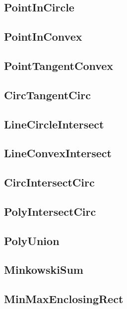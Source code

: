 \subsection{PointInCircle}

\subsection{PointInConvex}

\subsection{PointTangentConvex}

\subsection{CircTangentCirc}

\subsection{LineCircleIntersect}

\subsection{LineConvexIntersect}

\subsection{CircIntersectCirc}

\subsection{PolyIntersectCirc}

\subsection{PolyUnion}

\subsection{MinkowskiSum}

\subsection{MinMaxEnclosingRect}

